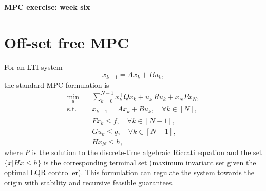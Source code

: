 \newpage
\begin{center}
\normalfont\Large\bfseries MPC exercise: week six
\end{center}
\setcounter{section}{0}
\section{Off-set free MPC}
For an LTI system
\begin{equation*}
    x_{k+1} = Ax_k + Bu_k,
\end{equation*}
the standard MPC formulation is
\begin{align*}
        \min_u \quad &\sum_{k = 0}^{N-1} x_k^{\top}Qx_k + u_k^{\top}Ru_k + x_N^{\top}Px_N,\\
    \text{s.t.}\quad &x_{k+1} =Ax_k + Bu_k, \quad\forall k \in [N],\\
    &Fx_k\leq f, \quad\forall k \in [N-1],\\
    &Gu_k\leq g, \quad\forall k \in [N-1],\\
    &Hx_N\leq h,
\end{align*}
where $P$ is the solution to the discrete-time algebraic Riccati equation and the set $\{x|Hx\leq h\}$ is the corresponding terminal set (maximum invariant set given the optimal LQR controller). This formulation can regulate the system towards the origin with stability and recursive feasible guarantees.
